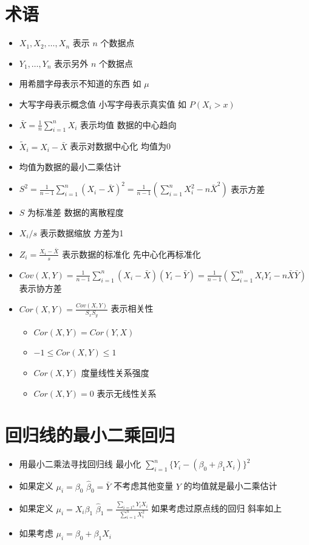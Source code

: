 \documentclass[]{book}
\providecommand{\tightlist}{%
  \setlength{\itemsep}{0pt}\setlength{\parskip}{0pt}}
\begin{document}
\section{术语}

\begin{itemize}
\tightlist
\item
  \(X_1, X_2, \ldots, X_n\) 表示 \(n\) 个数据点
\item
  \(Y_1, \ldots , Y_n\) 表示另外 \(n\) 个数据点
\item
  用希腊字母表示不知道的东西 如 \(\mu\)
\item
  大写字母表示概念值 小写字母表示真实值 如 \(P(X_i > x)\)
\item
  \(\bar X = \frac{1}{n}\sum_{i=1}^n X_i\) 表示均值 数据的中心趋向
\item
  \(\tilde X_i = X_i - \bar X\) 表示对数据中心化 均值为0
\item
  均值为数据的最小二乘估计
\item
  \(S^2 = \frac{1}{n-1} \sum_{i=1}^n (X_i - \bar X)^2 = \frac{1}{n-1} \left( \sum_{i=1}^n X_i^2 - n \bar X ^ 2 \right)\) 表示方差
\item
  \(S\) 为标准差 数据的离散程度
\item
  \(X_i / s\) 表示数据缩放 方差为1
\item
  \(Z_i = \frac{X_i - \bar X}{s}\) 表示数据的标准化 先中心化再标准化
\item
  \(Cov(X, Y) = \frac{1}{n-1}\sum_{i=1}^n (X_i - \bar X) (Y_i - \bar Y)= \frac{1}{n-1}\left( \sum_{i=1}^n X_i Y_i - n \bar X \bar Y\right)\) 表示协方差
\item
  \(Cor(X, Y) = \frac{Cov(X, Y)}{S_x S_y}\) 表示相关性

  \begin{itemize}
  \tightlist
  \item
    \(Cor(X, Y) = Cor(Y, X)\)
  \item
    \(-1 \leq Cor(X, Y) \leq 1\)
  \item
    \(Cor(X, Y)\) 度量线性关系强度
  \item
    \(Cor(X, Y) = 0\) 表示无线性关系
  \end{itemize}
\end{itemize}

\section{回归线的最小二乘回归}

\begin{itemize}
\tightlist
\item
  用最小二乘法寻找回归线 最小化 \(\sum_{i=1}^n \{Y_i - (\beta_0 + \beta_1 X_i)\}^2\)
\item
  如果定义 \(\mu_i = \beta_0\) \(\hat \beta_0 = \bar Y\) 不考虑其他变量 \(Y\) 的均值就是最小二乘估计
\item
  如果定义 \(\mu_i = X_i \beta_1\) \(\hat \beta_1 = \frac{\sum_{i=1^n} Y_i X_i}{\sum_{i=1}^n X_i^2}\) 如果考虑过原点线的回归 斜率如上
\item
  如果考虑 \(\mu_i = \beta_0 + \beta_1 X_i\)
\end{itemize}
\end{document}
